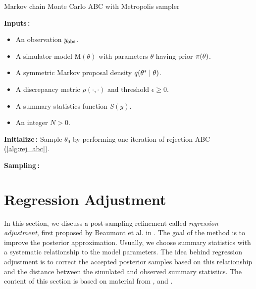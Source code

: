 \begin{algorithm}[!htb]
\caption{Markov chain Monte Carlo ABC with Metropolis sampler}
\label{alg:mcmcabc}
\SetAlgoLined
\DontPrintSemicolon
 \textbf{Inputs\,:}\;
 \vspace{-5mm}
 \begin{itemize}
    \item An observation $y_\mathrm{obs}$. 
     \item A simulator model $\mathrm{M}(\theta)$ with parameters $\theta$ having prior $\pi \qty(\theta)$.
     \item A symmetric Markov proposal density $q \qty(\theta^* \mid \theta)$.
     \item A discrepancy metric $\rho(\cdot, \cdot)$ and threshold $\epsilon \geq 0$. 
     \item A summary statistics function $S(y)$. 
     \item An integer $N>0$.
 \end{itemize}
 
 \vspace{5mm}
 \textbf{Initialize\,:}\;
 \nl Sample $\theta_0$ by performing one iteration of rejection ABC (\cref{alg:rej_abc}).\;

 \vspace{5mm}
 \textbf{Sampling\,:}\;
\end{algorithm}

\section{Regression Adjustment}

In this section, we discuss a post-sampling refinement called \textit{regression adjustment}, first proposed by Beaumont et al. in \cite{Beaumont}. The goal of the method is to improve the posterior approximation. Usually, we choose summary statistics with a systematic relationship to the model parameters. The idea behind regression adjustment is to correct the accepted posterior samples based on this relationship and the distance between the simulated and observed summary statistics. The content of this section is based on material from \cite{Beaumont}, \cite{abc_handbook} and \cite{lfi_cogsci}. 

